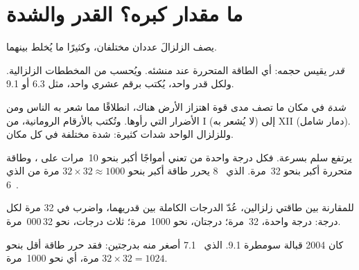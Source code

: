 \section{ما مقدار كبره؟ القدر والشدة}

يصف الزلزالَ عددان مختلفان، وكثيرًا ما يُخلط بينهما.

\begin{definition}[القدر]\label{def:g7:earthquakes:magnitude}
\emph{قدر}  يقيس حجمه: أي الطاقة المتحررة عند منشئه.
ويُحسب من المخططات الزلزالية. ولكل  قدر واحد، يُكتب برقم عشري
واحد، مثل 6.3 أو 9.1.
\end{definition}

\begin{definition}[الشدة]\label{def:g7:earthquakes:intensity}
\emph{شدة}  في مكان ما تصف مدى قوة اهتزاز الأرض هناك،
انطلاقًا مما شعر به الناس ومن الأضرار التي رأوها. وتُكتب بالأرقام
الرومانية، من I (لا يُشعر به) إلى XII (دمار شامل). وللزلزال الواحد
شدات كثيرة: شدة مختلفة في كل مكان.
\end{definition}

يرتفع سلم  بسرعة. فكل درجة واحدة من  تعني أمواجًا أكبر بنحو
10~مرات على ، وطاقة متحررة أكبر بنحو 32~مرة.  الذي
~8 يحرر طاقة أكبر بنحو $32 \times 32 \approx 1000$ مرة من  الذي
~6.

\begin{method}\label{met:g7:earthquakes:magnitudes}
للمقارنة بين طاقتي زلزالين، عُدّ الدرجات الكاملة بين قدريهما، واضرب
في 32 مرة لكل درجة: درجة واحدة، 32~مرة؛ درجتان، نحو 1000~مرة؛ ثلاث
درجات، نحو 32\,000~مرة.
\end{method}

\begin{example}\label{ex:g7:earthquakes:nine-seven}
كان   2004 قبالة سومطرة 9.1.  الذي ~7.1 أصغر منه
بدرجتين: فقد حرر طاقة أقل بنحو $32 \times 32 = 1024$ مرة، أي نحو
1000~مرة.
\end{example}

